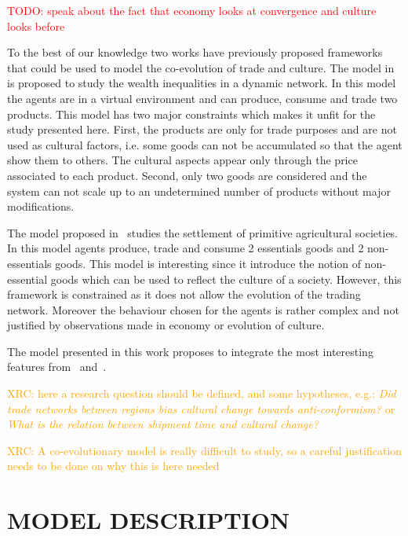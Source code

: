 \documentclass{wscpaperproc}
\newcommand{\memo}[2]{\textcolor{#1}{#2}}
\newcommand{\todo}[1]{\memo{red}{TODO: #1\\}}
\newcommand{\xrc}[1]{\memo{orange}{XRC: #1\\}}
\begin{document}
\todo{speak about the fact that economy looks at convergence and culture looks before}

To the best of our knowledge two works have previously proposed frameworks that could be used to model the co-evolution of trade and culture. The model in~\cite{bentley_specialisation_2005} is proposed to study the wealth inequalities in a dynamic network. In this model the agents are in a virtual environment and can produce, consume and trade two products. This model has two major constraints which makes it unfit for the study presented here. First, the products are only for trade purposes and are not used as cultural factors, i.e. some goods can not be accumulated so that the agent show them to others. The cultural aspects appear only through the price associated to each product. Second, only two goods are considered and the system can not scale up to an undetermined number of products without major modifications.

The model proposed in~\cite{macmillan_agent-based_2008} studies the settlement of primitive agricultural societies. In this model agents produce, trade and consume 2 essentials goods and 2 non-essentials goods. This model is interesting since it introduce the notion of non-essential goods which can be used to reflect the culture of a society. However, this framework is constrained as it does not allow the evolution of the trading network. Moreover the behaviour chosen for the agents is rather complex and not justified by observations made in economy or evolution of culture.

The model presented in this work proposes to integrate the most interesting features from~\cite{bentley_specialisation_2005} and~\cite{macmillan_agent-based_2008}.

\xrc{here a research question should be defined, and some hypotheses, e.g.: \emph{Did trade networks between regions bias cultural change towards anti-conformism?} or \emph{What is the relation between shipment time and cultural change?}}

\xrc{A co-evolutionary model is really difficult to study, so a careful justification needs to be done on why this is here needed}

\section{MODEL DESCRIPTION}
\end{document}
